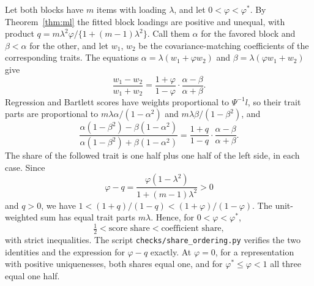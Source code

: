 Let both blocks have $m$ items with loading $\lambda$, and let $0<\varphi<\varphi^*$. By Theorem~\ref{thm:ml} the fitted block loadings are positive and unequal, with product $q=m\lambda^2\varphi/\{1+(m-1)\lambda^2\}$. Call them $\alpha$ for the favored block and $\beta<\alpha$ for the other, and let $w_1$, $w_2$ be the covariance-matching coefficients of the corresponding traits. The equations $\alpha=\lambda(w_1+\varphi w_2)$ and $\beta=\lambda(\varphi w_1+w_2)$ give
\[
\frac{w_1-w_2}{w_1+w_2}=\frac{1+\varphi}{1-\varphi}\cdot\frac{\alpha-\beta}{\alpha+\beta} .
\]
Regression and Bartlett scores have weights proportional to $\Psi^{-1}l$, so their trait parts are proportional to $m\lambda\alpha/(1-\alpha^2)$ and $m\lambda\beta/(1-\beta^2)$, and
\[
\frac{\alpha(1-\beta^2)-\beta(1-\alpha^2)}{\alpha(1-\beta^2)+\beta(1-\alpha^2)}
=\frac{1+q}{1-q}\cdot\frac{\alpha-\beta}{\alpha+\beta} .
\]
The share of the followed trait is one half plus one half of the left side, in each case. Since
\[
\varphi-q=\frac{\varphi(1-\lambda^2)}{1+(m-1)\lambda^2}>0
\]
and $q>0$, we have $1<(1+q)/(1-q)<(1+\varphi)/(1-\varphi)$. The unit-weighted sum has equal trait parts $m\lambda$. Hence, for $0<\varphi<\varphi^*$,
\[
\tfrac12<\text{score share}<\text{coefficient share},
\]
with strict inequalities. The script \texttt{checks/share\_ordering.py} verifies the two identities and the expression for $\varphi-q$ exactly. At $\varphi=0$, for a representation with positive uniquenesses, both shares equal one, and for $\varphi^*\le\varphi<1$ all three equal one half.
